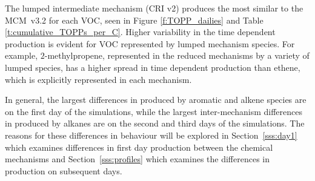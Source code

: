 The lumped intermediate mechanism (CRI v2) produces the most similar  to the \mbox{MCM v3.2} for each VOC, seen in Figure \ref{f:TOPP_dailies} and Table \ref{t:cumulative_TOPPs_per_C}.
Higher variability in the time dependent  production is evident for VOC represented by lumped mechanism species.
For example, $2$-methylpropene, represented in the reduced mechanisms by a variety of lumped species, has a higher spread in time dependent  production than ethene, which is explicitly represented in each mechanism.

In general, the largest differences in  produced by aromatic and alkene species are on the first day of the simulations, while the largest inter-mechanism differences in  produced by alkanes are on the second and third days of the simulations.
The reasons for these differences in behaviour will be explored in \mbox{Section \ref{sss:day1}} which examines differences in first day  production between the chemical mechanisms and \mbox{Section \ref{sss:profiles}} which examines the differences in  production on subsequent days.
%
